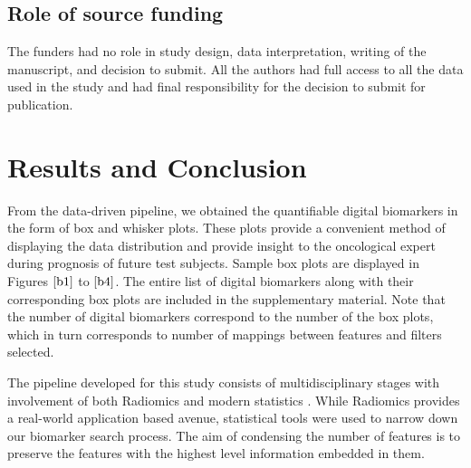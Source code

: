 \documentclass[final,1p,times,twocolumn]{elsarticle}
\begin{document}

\subsection{Role of source funding}

The funders had no role in study design, data interpretation, writing of the manuscript, and decision to submit. All the authors had full access to all the data used in the study and had final responsibility for the decision to submit for publication.

\section{Results and Conclusion}

From the data-driven pipeline, we obtained the quantifiable digital biomarkers in the form of box and whisker plots. These plots provide a convenient method of displaying the data distribution and provide insight to the oncological expert during prognosis of future test subjects. Sample box plots are displayed in Figures $\ref{b1}$ to $\ref{b4}$. The entire list of digital biomarkers along with their corresponding box plots are included in the supplementary material. Note that the number of digital biomarkers correspond to the number of the box plots, which in turn corresponds to number of mappings between features and filters selected. 

The pipeline developed for this study consists of multidisciplinary stages with involvement of both Radiomics and modern statistics \cite{22}. While Radiomics provides a real-world application based avenue, statistical tools were used to narrow down our biomarker search process. The aim of condensing the number of features is to preserve the features with the highest level information embedded in them. 
\end{document}
